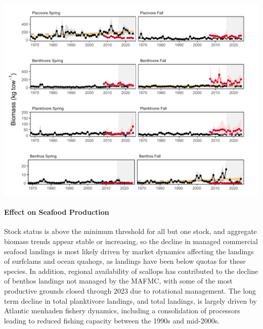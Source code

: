 \documentclass[
  10pt,
]{article}
\let\origfigure\figure
\let\endorigfigure\endfigure
\renewenvironment{figure}[1][2] {
    \expandafter\origfigure\expandafter[H]
} {
    \endorigfigure
}
\begin{document}
\begin{figure}

{\centering \includegraphics{midatlantic_files/figure-latex/nefsc-biomass-mab-1} 

}

\caption{Spring (left) and fall (right) surveyed biomass in the Mid-Atlantic Bight. Data from the NEFSC Bottom Trawl Survey are shown in black, with the nearshore NEAMAP survey shown in red. Significant increases (orange lines) are present for spring piscivore and fall benthivore and benthos biomass. The shaded area around each annual mean represents 2 standard deviations from the mean.}\label{fig:nefsc-biomass-mab}
\end{figure}

\paragraph{Effect on Seafood Production}\label{effect-on-seafood-production}

Stock status is above the minimum threshold for all but one stock, and aggregate biomass trends appear stable or increasing, so the decline in managed commercial seafood landings is most likely driven by market dynamics affecting the landings of surfclams and ocean quahogs, as landings have been below quotas for these species. In addition, regional availability of scallops has contributed to the decline of benthos landings not managed by the MAFMC, with some of the most productive grounds closed through 2023 due to rotational management. The long term decline in total planktivore landings, and total landings, is largely driven by Atlantic menhaden fishery dynamics, including a consolidation of processors leading to reduced fishing capacity between the 1990s and mid-2000s.
\end{document}
